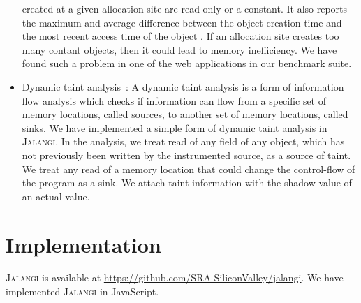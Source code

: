 \documentclass{sig-alternate}
\def\jalangi{\textsc{Jalangi}}
\begin{document}
\begin{itemize}
  created at a given allocation site are read-only or a constant.  It
  also reports the maximum and average difference between the object
  creation time and the most recent access time of the object .  If an
  allocation site creates too many contant objects, then it could lead
  to memory inefficiency.  We have found such a problem in one of the
  web applications in our benchmark suite.
\item Dynamic taint analysis~\cite{songndss05}: A dynamic taint
  analysis is a form of information flow analysis which checks if
  information can flow from a specific set of memory locations, called
  sources, to another set of memory locations, called sinks.  We have
  implemented a simple form of dynamic taint analysis in \jalangi{}.
  In the analysis, we treat read of any field of any object, which has
  not previously been written by the instrumented source, as a source
  of taint.  We treat any read of a memory location that could change
  the control-flow of the program as a sink.  We attach taint
  information with the shadow value of an actual value.
\end{itemize}


\section{Implementation}
\label{sec:implementation}

\jalangi{} is available at
\url{https://github.com/SRA-SiliconValley/jalangi}.  We have
implemented \jalangi{} in JavaScript.
\end{document}
